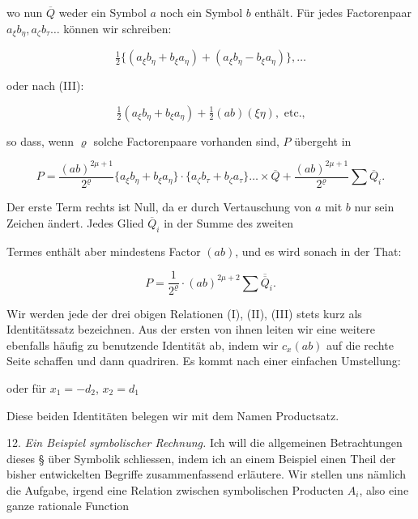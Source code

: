wo nun $\overline{Q}$ weder ein Symbol $a$ noch ein Symbol $b$ enthält.
Für jedes Factorenpaar $a_\xi b_\eta, a_\zeta b_\tau \ldots$ können wir
schreiben:

\[ \tfrac{1}{2}\{(a_\xi b_\eta + b_\xi a_\eta) + (a_\xi b_\eta - b_\xi a_\eta)\}, \ldots \]

oder nach (III):

\[ \tfrac{1}{2} (a_\xi b_\eta + b_\xi a_\eta) + \tfrac{1}{2} (ab)(\xi\eta), \text{ etc.,} \]

so dass, wenn $\varrho$ solche Factorenpaare vorhanden sind, $P$ übergeht in

\[
P = \frac{(ab)^{2\mu+1}}{2^\varrho}\{a_\xi b_\eta + b_\xi a_\eta\}\cdot
\{a_\zeta b_\tau + b_\zeta a_\tau\}\ldots \times \overline{Q}
+ \frac{(ab)^{2\mu+1}}{2^\varrho}\sum \overline{Q}_i.
\]

Der erste Term rechts ist Null, da er durch Vertauschung von $a$ mit
$b$ nur sein Zeichen ändert. Jedes Glied $\overline{Q}_i$ in der Summe des zweiten


Termes enthält aber mindestens  Factor $(ab)$, und es wird
sonach in der That:

\[ P = \frac{1}{2^\varrho}\cdot (ab)^{2\mu+2}\sum \overline{\overline{Q}}_i. \]

Wir werden jede der drei obigen Relationen (I), (II), (III) stets
kurz als \glqq Identitätssatz\grqq{} bezeichnen. Aus der ersten von ihnen
leiten wir eine weitere ebenfalls häufig zu benutzende Identität ab,
indem wir $c_x (ab)$ auf die rechte Seite schaffen und dann quadriren.
Es kommt nach einer einfachen Umstellung:


oder für $x_1 = -d_2$, $x_2 = d_1$


Diese beiden Identitäten belegen wir mit dem Namen \glqq Productsatz\grqq{}.

12. \textit{Ein Beispiel symbolischer Rechnung.} Ich will die allgemeinen
Betrachtungen dieses § über Symbolik schliessen, indem ich an einem
Beispiel einen Theil der bisher entwickelten Begriffe zusammenfassend
erläutere. Wir stellen uns nämlich die Aufgabe, irgend eine Relation
zwischen symbolischen Producten $A_i$, also eine ganze rationale Function

